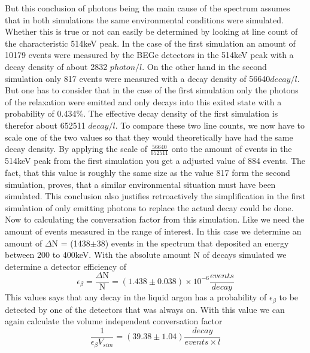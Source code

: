 \documentclass[encoding=utf8,british]{tumphthesis}
\begin{document}
But this conclusion of photons being the main cause of the spectrum assumes that in both simulations the same environmental conditions were simulated.
Whether this is true or not can easily be determined by looking at line count of the characteristic 514keV peak.
In the case of the first simulation an amount of 10179 events were measured by the BEGe detectors in the 514keV peak with a decay density of about 2832 $\unit{photon}/\unit{l}$.
On the other hand in the second simulation only 817 events were measured with a decay density of 56640$\unit{decay}/\unit{l}$.
But one has to consider that in the case of the first simulation only the photons of the  relaxation were emitted and \Kr only decays into this exited state with a probability of 0.434$\%$.
The effective decay density of the first simulation is therefor about 652511 $\unit{decay}/\unit{l}$.
To compare these two line counts, we now have to scale one of the two values so that they would theoretically have had the same decay density.
By applying the scale of $\frac{56640}{652511}$ onto the amount of events in the 514keV peak from the first simulation you get a adjusted value of 884 events.
The fact, that this value is roughly the same size as the value 817 form the second simulation, proves, that a similar environmental situation must have been simulated.
This conclusion also justifies retroactively the simplification in the first simulation of only emitting photons to replace the actual decay could be done.
\\

Now to calculating the conversation factor from this simulation.
Like we need the amount of events measured in the range of interest.
In this case we determine an amount of $\Delta$N = (1438$\pm$38) events in the spectrum that deposited an energy between 200 to 400keV.
With the absolute amount N of decays simulated we determine a detector efficiency of
\begin{equation*}
    \epsilon_{\beta} = \frac{\Delta \mathrm{N}}{\mathrm{N}} = (1.438\pm0.038)\times10^{-6} \frac{\unit{events}}{\unit{decay}}
\end{equation*}
This values says that any decay in the liquid argon has a probability of $\epsilon_{\beta}$ to be detected by one of the detectors that was always on.
With this value we can again calculate the volume independent conversation factor
\begin{equation*}
    \frac{1}{\epsilon_{\beta} V_{sim}} = (39.38\pm1.04) \frac{\unit{decay}}{\unit{events} \times l }
\end{equation*}
\\
\end{document}
